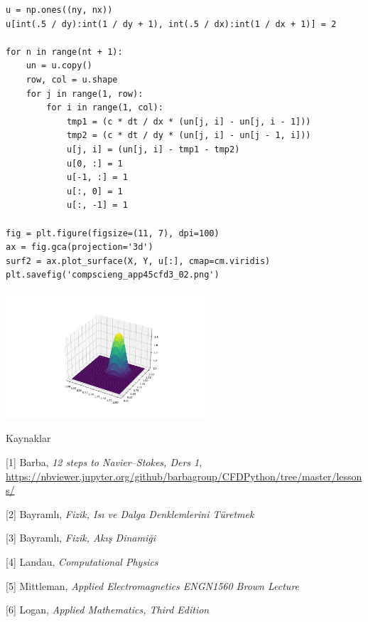 \documentclass[12pt,fleqn]{article}\usepackage{../../common}
\begin{document}
\begin{verbatim}
u = np.ones((ny, nx))
u[int(.5 / dy):int(1 / dy + 1), int(.5 / dx):int(1 / dx + 1)] = 2

for n in range(nt + 1): 
    un = u.copy()
    row, col = u.shape
    for j in range(1, row):
        for i in range(1, col):
            tmp1 = (c * dt / dx * (un[j, i] - un[j, i - 1]))
            tmp2 = (c * dt / dy * (un[j, i] - un[j - 1, i]))
            u[j, i] = (un[j, i] - tmp1 - tmp2)
            u[0, :] = 1
            u[-1, :] = 1
            u[:, 0] = 1
            u[:, -1] = 1

fig = plt.figure(figsize=(11, 7), dpi=100)
ax = fig.gca(projection='3d')
surf2 = ax.plot_surface(X, Y, u[:], cmap=cm.viridis)
plt.savefig('compscieng_app45cfd3_02.png')
\end{verbatim}

\includegraphics[width=20em]{compscieng_app45cfd3_02.png}

Kaynaklar

[1] Barba, {\em 12 steps to Navier–Stokes, Ders 1},
    \url{https://nbviewer.jupyter.org/github/barbagroup/CFDPython/tree/master/lessons/}

[2] Bayramlı, {\em Fizik, Isı ve Dalga Denklemlerini Türetmek}

[3] Bayramlı, {\em Fizik, Akış Dinamiği}

[4] Landau, {\em Computational Physics}

[5] Mittleman, {\em Applied Electromagnetics ENGN1560 Brown Lecture}

[6] Logan, {\em Applied Mathematics, Third Edition}
\end{document}
